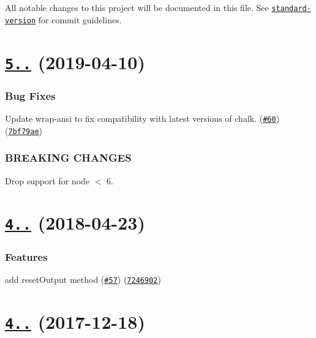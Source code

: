All notable changes to this project will be documented in this file. See \href{https://github.com/conventional-changelog/standard-version}{\tt standard-\/version} for commit guidelines.

\section*{\href{https://github.com/yargs/cliui/compare/v4.1.0...v5.0.0}{\tt 5..} (2019-\/04-\/10)}

\subsubsection*{Bug Fixes}


\begin{DoxyItemize}
\item Update wrap-\/ansi to fix compatibility with latest versions of chalk. (\href{https://github.com/yargs/cliui/issues/60}{\tt \#60}) (\href{https://github.com/yargs/cliui/commit/7bf79ae}{\tt 7bf79ae})
\end{DoxyItemize}

\subsubsection*{B\+R\+E\+A\+K\+I\+NG C\+H\+A\+N\+G\+ES}


\begin{DoxyItemize}
\item Drop support for node $<$ 6.
\end{DoxyItemize}

\label{_4.1.0}%
 \section*{\href{https://github.com/yargs/cliui/compare/v4.0.0...v4.1.0}{\tt 4..} (2018-\/04-\/23)}

\subsubsection*{Features}


\begin{DoxyItemize}
\item add reset\+Output method (\href{https://github.com/yargs/cliui/issues/57}{\tt \#57}) (\href{https://github.com/yargs/cliui/commit/7246902}{\tt 7246902})
\end{DoxyItemize}

\label{_4.0.0}%
 \section*{\href{https://github.com/yargs/cliui/compare/v3.2.0...v4.0.0}{\tt 4..} (2017-\/12-\/18)}

